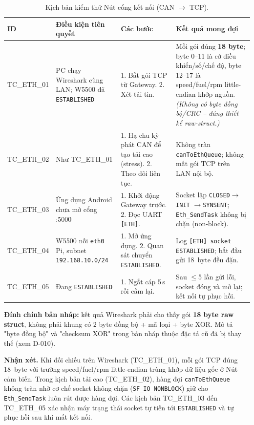 \documentclass[../DoAn.tex]{subfiles}
\begin{document}
\begin{table}[H]
  \centering
  \caption{Kịch bản kiểm thử Nút cổng kết nối (CAN $\to$ TCP).}
  \label{tab:tc-eth}
  \begin{tabular}{@{}p{1.7cm}p{2.6cm}p{4.2cm}p{4.2cm}@{}}
    \toprule
    \textbf{ID} & \textbf{Điều kiện tiên quyết} & \textbf{Các bước} & \textbf{Kết quả mong đợi} \\
    \midrule
    TC\_ETH\_01 & PC chạy Wireshark cùng LAN; W5500 đã \texttt{ESTABLISHED} &
      1. Bắt gói TCP từ Gateway. 2. Xét tải tin. & Mỗi gói đúng \textbf{18 byte};
      byte 0--11 là cờ điều khiển/số/chế độ, byte 12--17 là speed/fuel/rpm
      little-endian khớp nguồn. \emph{(Không có byte đồng bộ/CRC -- đúng thiết
      kế raw-struct.)} \\
    TC\_ETH\_02 & Như TC\_ETH\_01 & 1. Hạ chu kỳ phát CAN để tạo tải cao
      (stress). 2. Theo dõi liên tục. & Không tràn \texttt{canToEthQueue};
      không mất gói TCP trên LAN nội bộ. %
      \\
    TC\_ETH\_03 & Ứng dụng Android chưa mở cổng :5000 & 1. Khởi động Gateway
      trước. 2. Đọc UART \texttt{[ETH]}. & Socket lặp \texttt{CLOSED}$\to$\texttt{INIT}
      $\to$\texttt{SYNSENT}; \texttt{Eth\_SendTask} không bị chặn (non-block). \\
    TC\_ETH\_04 & W5500 nối \texttt{eth0} Pi, subnet \texttt{192.168.10.0/24} &
      1. Mở ứng dụng. 2. Quan sát chuyển \texttt{ESTABLISHED}. & Log
      \texttt{[ETH] socket ESTABLISHED}; bắt đầu gửi 18~byte đều đặn. \\
    TC\_ETH\_05 & Đang \texttt{ESTABLISHED} & 1. Ngắt cáp 5\,s rồi cắm lại. &
      Sau $\le$5 lần gửi lỗi, socket đóng và mở lại; kết nối tự phục hồi. \\
    \bottomrule
  \end{tabular}
\end{table}

\medskip
\noindent\textbf{Đính chính bản nháp:} kết quả Wireshark phải cho thấy gói
\textbf{18 byte raw struct}, không phải khung có 2 byte đồng bộ + mã loại + byte
XOR. Mô tả "byte đồng bộ" và "checksum XOR" trong bản nháp thuộc đặc tả cũ đã bị
thay thế (xem D-010).

\textbf{Nhận xét.} Khi đối chiếu trên Wireshark (TC\_ETH\_01), mỗi gói TCP đúng
18~byte với trường speed/fuel/rpm little-endian trùng khớp dữ liệu gốc ở Nút cảm
biến. Trong kịch bản tải cao (TC\_ETH\_02), hàng đợi \texttt{canToEthQueue}
không tràn nhờ cơ chế socket không chặn (\texttt{SF\_IO\_NONBLOCK}) giữ cho
\texttt{Eth\_SendTask} luôn rút được hàng đợi. Các kịch bản TC\_ETH\_03 đến
TC\_ETH\_05 xác nhận máy trạng thái socket tự tiến tới \texttt{ESTABLISHED} và tự
phục hồi sau khi mất kết nối.
\end{document}
